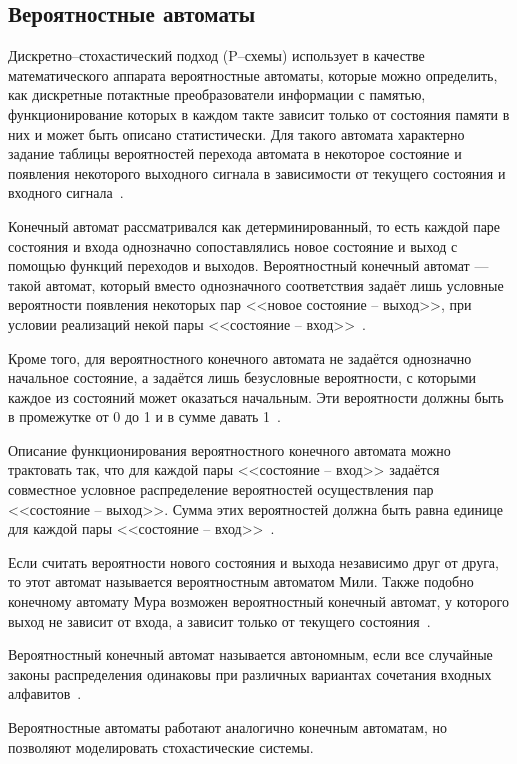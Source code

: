 \subsection{Вероятностные автоматы}

Дискретно--стохастический подход (P--схемы) использует в качестве математического аппарата вероятностные автоматы, которые можно определить, как дискретные потактные преобразователи информации с памятью, функционирование которых в каждом такте зависит только от состояния памяти в них и может быть описано статистически. Для такого автомата характерно задание таблицы вероятностей перехода автомата в некоторое состояние и появления некоторого выходного сигнала в зависимости от текущего состояния и входного сигнала~\cite{sheme_types}.

Конечный автомат рассматривался как детерминированный, то есть каждой паре состояния и входа однозначно сопоставлялись новое состояние и выход с помощью функций переходов и выходов. Вероятностный конечный автомат --- такой автомат, который вместо однозначного соответствия задаёт лишь условные вероятности появления некоторых пар <<новое состояние -- выход>>, при условии реализаций некой пары <<состояние -- вход>>~\cite{va}.

Кроме того, для вероятностного конечного автомата не задаётся однозначно начальное состояние, а задаётся лишь безусловные вероятности, с которыми каждое из состояний может оказаться начальным. Эти вероятности должны быть в промежутке от 0 до 1 и в сумме давать 1~\cite{va}. 

Описание функционирования вероятностного конечного автомата можно трактовать так, что для каждой пары <<состояние -- вход>> задаётся совместное условное распределение вероятностей осуществления пар <<состояние -- выход>>. Сумма этих вероятностей должна быть равна единице для каждой пары <<состояние -- вход>>~\cite{va}.

Если считать вероятности нового состояния и выхода независимо друг от друга, то этот автомат называется вероятностным автоматом Мили. Также подобно конечному автомату Мура возможен вероятностный конечный автомат, у которого выход не зависит от входа, а зависит только от текущего состояния~\cite{va}.

Вероятностный конечный автомат называется автономным, если все случайные законы распределения одинаковы при различных вариантах сочетания входных алфавитов~\cite{va}.

Вероятностные автоматы работают аналогично конечным автоматам, но позволяют моделировать стохастические системы.

